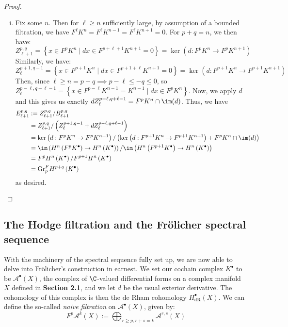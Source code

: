 \begin{proof}
\begin{enumerate}[i.]
        \item Fix some $n$. Then for $\ell\geq n$ sufficiently large, by assumption of a bounded filtration, we have $F^\ell K^n = F^\ell K^{n-1} = F^\ell K^{n+1} =0$. For $p+q=n$, we then have:
        $$
        Z_{\ell+1}^{p,q} =\left\{x\in F^p K^n \mid dx\in F^{p+\ell+1} K^{n+1} = 0\right\}= \ker \left(d:F^pK^n\to F^pK^{n+1}\right)
        $$
        Similarly, we have:
        $$
        Z_{\ell}^{p+1,q-1} = \left\{x\in F^{p+1}K^n\mid dx\in F^{p+1+\ell} K^{n+1}=0\right\} = \ker \left(d:F^{p+1}K^n\to F^{p+1}K^{n+1}\right)
        $$
        Then, since $\ell \geq n=p+q \implies p-\ell \leq -q \leq 0$, so $Z_\ell^{p-\ell,q+\ell-1} = \left\{x\in F^{p-\ell}K^{n-1} =K^{n-1}\mid dx\in F^p K^{n}\right\}$. Now, we apply $d$ and this gives us exactly $dZ_\ell^{p-\ell,q+\ell-1}=F^pK^n\cap \im (d)$. Thus, we have
        \begin{align*}
        E_{\ell+1}^{p,q} &:= Z_{\ell+1}^{p,q} /B_{\ell+1}^{p,q} \\
        &= Z_{\ell+1}^{p,q} /\left(Z_{\ell}^{p+1,q-1} + dZ_{\ell}^{p-\ell,q+\ell-1}\right) \\
        &= \ker \left(d:F^pK^n\to F^pK^{n+1}\right) / \left(\ker \left(d:F^{p+1}K^n\to F^{p+1}K^{n+1}\right) +F^pK^n\cap \im (d)\right) \\
        &= \im \left(H^n\left(F^pK^\bullet\right)\to H^n\left(K^\bullet\right)\right)/\im \left(H^n\left(F^{p+1}K^\bullet\right)\to H^n\left(K^\bullet\right)\right) \\
        &= F^pH^n\left(K^\bullet\right) / F^{p+1}H^n\left(K^\bullet\right) \\
        &= \mathrm{Gr}_p^FH^{p+q}\left(K^\bullet\right)
        \end{align*}
        as desired.
    \end{enumerate}
\end{proof}

\subsection{The Hodge filtration and the Fr\"olicher spectral sequence}
With the machinery of the spectral sequence fully set up, we are now able to delve into Fr\"olicher's construction in earnest. We set our cochain complex $K^\bullet$ to be $\mathcal{A}^\bullet(X)$, the complex of $\C$-valued differential forms on a complex manifold $X$ defined in \textbf{Section 2.1}, and we let $d$ be the usual exterior derivative. The cohomology of this complex is then the de Rham cohomology $H^\bullet_\mathrm{dR}(X)$. We can define the so-called \emph{naive filtration} on $\mathcal{A}^\bullet(X)$, given by:
$$
F^p\mathcal{A}^k(X) :=\bigoplus_{r\geq p, r+s=k} \mathcal{A}^{r,s}(X)
$$

